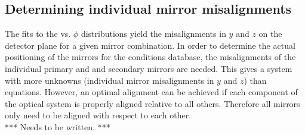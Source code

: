 \subsection{Determining individual mirror misalignments}
\label{subsec:IndivMirrAlign}
The fits to the \deltatheta vs. $\phi$ distributions yield the misalignments in $y$ and $z$ on the detector plane for a given mirror combination. In order to determine the actual positioning of the mirrors for the \lhcb conditions database, the misalignments of the individual primary and and secondary mirrors are needed. This gives a system with more unknowns (individual mirror misalignments in $y$ and $z$) than equations. However, an optimal alignment can be achieved if each component of the optical system is properly aligned relative to all others. Therefore all mirrors only need to be aligned with respect to each other.\\


*** Needs to be written. ***

